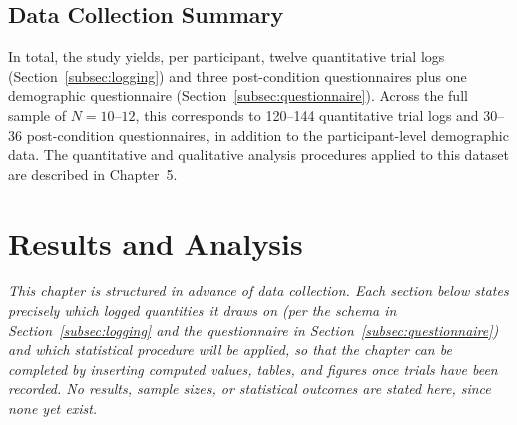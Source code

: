 \documentclass[12pt, a4paper]{report}
\begin{document}
\section{Data Collection Summary}
In total, the study yields, per participant, twelve quantitative trial logs (Section~\ref{subsec:logging}) and three post-condition questionnaires plus one demographic questionnaire (Section~\ref{subsec:questionnaire}). Across the full sample of $N=10$--$12$, this corresponds to 120--144 quantitative trial logs and 30--36 post-condition questionnaires, in addition to the participant-level demographic data. The quantitative and qualitative analysis procedures applied to this dataset are described in Chapter~5.

\chapter{Results and Analysis}

\textit{This chapter is structured in advance of data collection. Each section below states precisely which logged quantities it draws on (per the schema in Section~\ref{subsec:logging} and the questionnaire in Section~\ref{subsec:questionnaire}) and which statistical procedure will be applied, so that the chapter can be completed by inserting computed values, tables, and figures once trials have been recorded. No results, sample sizes, or statistical outcomes are stated here, since none yet exist.}
\end{document}
